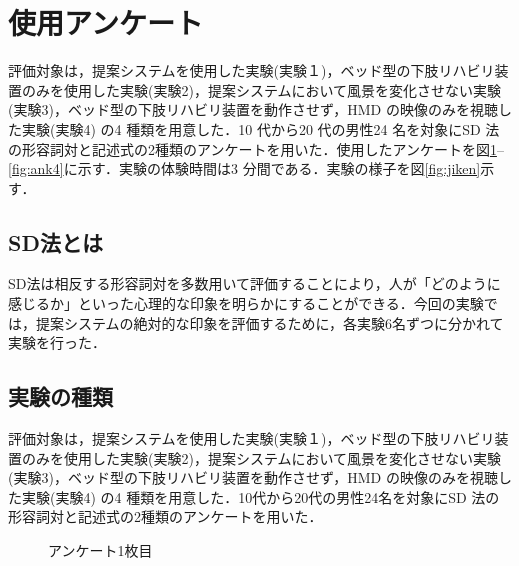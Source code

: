 \section{使用アンケート}
評価対象は，提案システムを使用した実験(実験１)，ベッド型の下肢リハビリ装置のみを使用した実験(実験2)，提案システムにおいて風景を変化させない実験(実験3)，ベッド型の下肢リハビリ装置を動作させず，HMD の映像のみを視聴した実験(実験4) の4 種類を用意した．10 代から20 代の男性24 名を対象にSD 法の形容詞対と記述式の2種類のアンケートを用いた．使用したアンケートを図\ref{fig:ank1}--\ref{fig:ank4}に示す．実験の体験時間は3 分間である．実験の様子を図\ref{fig:jiken}示す．

\subsection{SD法とは}
SD法\cite{人間工学ガイド}は相反する形容詞対を多数用いて評価することにより，人が「どのように感じるか」といった心理的な印象を明らかにすることができる．今回の実験では，提案システムの絶対的な印象を評価するために，各実験6名ずつに分かれて実験を行った．

\subsection{実験の種類}
評価対象は，提案システムを使用した実験(実験１)，ベッド型の下肢リハビリ装置のみを使用した実験(実験2)，提案システムにおいて風景を変化させない実験(実験3)，ベッド型の下肢リハビリ装置を動作させず，HMD の映像のみを視聴した実験(実験4) の4 種類を用意した．10代から20代の男性24名を対象にSD 法の形容詞対と記述式の2種類のアンケートを用いた．

\begin{figure}[tbp]
	\centering
	\caption{アンケート1枚目}
	\label{fig:ank1}
\end{figure}

